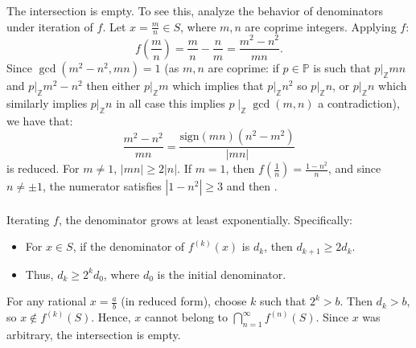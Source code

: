\begin{solution}
    The intersection is empty. To see this, analyze the behavior of denominators under iteration of \( f \). Let \( x = \frac{m}{n} \in S \), where \( m, n \) are coprime integers. Applying \( f \):
    \[
        f\left(\frac{m}{n}\right) = \frac{m}{n} - \frac{n}{m} = \frac{m^2 - n^2}{mn}.
    \]
    Since \( \gcd\left(m^2 - n^2, mn\right) = 1 \) (as \( m, n \) are coprime: if \( p\in\mathbb{P} \) is such that \( p|_{\mathbb{Z}}mn \) and \( p|_{\mathbb{Z}}m^2-n^2 \) then either \( p|_{\mathbb{Z}}m \) which implies that \( p|_{\mathbb{Z}}n^2 \) so \( p|_{\mathbb{Z}}n \), or \( p|_{\mathbb{Z}}n \) which similarly implies \( p|_{\mathbb{Z}}n \) in all case this implies \( p\mid_{\mathbb{Z}}\gcd\left(m,n\right) \) a contradiction), we have that:
    \[
        \frac{m^2 - n^2}{mn} = \frac{\text{sign}\left(mn\right)\left(n^2-m^2\right)}{|mn|}
    \]
    is reduced. For \( m \neq 1 \), \( |mn| \geq 2|n| \). If \( m = 1 \), then \( f\left(\frac{1}{n}\right) = \frac{1 - n^2}{n} \), and since \( n \neq \pm 1 \), the numerator satisfies \( |1 - n^2| \geq 3 \) and then .
    \\\\
    Iterating \( f \), the denominator grows at least exponentially. Specifically:
    \begin{itemize}
        \item For \( x \in S \), if the denominator of \( f^{\left(k\right)}\left(x\right) \) is \( d_k \), then \( d_{k+1} \geq 2d_k \).
        \item Thus, \( d_k \geq 2^k d_0 \), where \( d_0 \) is the initial denominator.
    \end{itemize}
    For any rational \( x = \frac{a}{b} \) (in reduced form), choose \( k \) such that \( 2^k > b \). Then \( d_k > b \), so \( x \notin f^{\left(k\right)}\left(S\right) \). Hence, \( x \) cannot belong to \( \bigcap_{n=1}^{\infty} f^{\left(n\right)}\left(S\right) \). Since \( x \) was arbitrary, the intersection is empty.
\end{solution}
